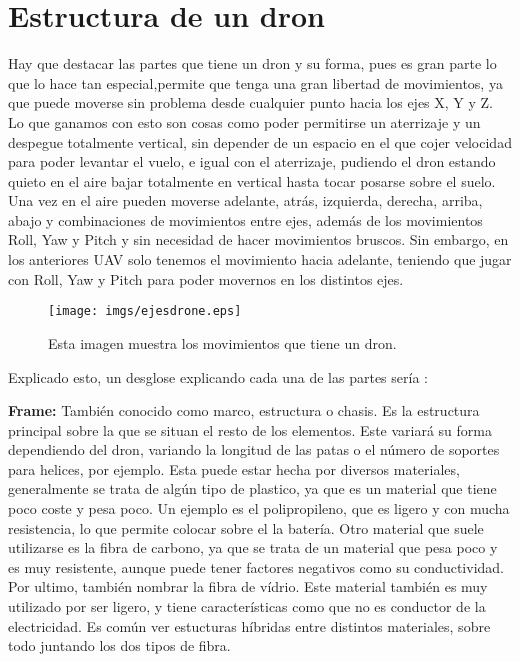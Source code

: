 \section{Estructura de un dron}
\hspace{1 cm} Hay que destacar las partes que tiene un dron y su forma, pues es gran parte lo que lo hace tan especial,permite que tenga una gran libertad de movimientos, ya que puede moverse sin problema desde cualquier punto hacia los ejes X, Y y Z. Lo que ganamos con esto son cosas como poder permitirse un aterrizaje y un despegue totalmente vertical, sin depender de un espacio en el que cojer velocidad para poder levantar el vuelo, e igual con el aterrizaje, pudiendo el dron estando quieto en el aire bajar totalmente en vertical hasta tocar posarse sobre el suelo. Una vez en el aire pueden moverse adelante, atr\'as, izquierda, derecha, arriba, abajo y combinaciones de movimientos entre ejes, adem\'as de los movimientos Roll, Yaw y Pitch y sin necesidad de hacer movimientos bruscos. Sin embargo, en los anteriores UAV solo tenemos el movimiento hacia adelante, teniendo que jugar con Roll, Yaw y Pitch para poder movernos en los distintos ejes.

\begin{figure}[ht]
	\centering
		\texttt{[image: imgs/ejesdrone.eps]}
		\caption{Esta imagen muestra los movimientos que tiene un dron.}
	\label{fig:ejesdrone}
\end{figure}

\hspace{1 cm} Explicado esto, un desglose explicando cada una de las partes ser\'ia :

\hspace{1 cm}\textbf{Frame:} Tambi\'en conocido como marco, estructura o chasis. Es la estructura principal sobre la que se situan el resto de los elementos. Este variar\'a su forma dependiendo del dron, variando la longitud de las patas o el n\'umero de soportes para helices, por ejemplo. Esta puede estar hecha por diversos materiales, generalmente se trata de alg\'un tipo de plastico, ya que es un material que tiene poco coste y pesa poco. Un ejemplo es el polipropileno, que es ligero y con mucha resistencia, lo que permite colocar sobre el la bater\'ia. Otro material que suele utilizarse es la fibra de carbono, ya que se trata de un material que pesa poco y es muy resistente, aunque puede tener factores negativos como su conductividad. Por ultimo, tambi\'en nombrar la fibra de v\'idrio. Este material tambi\'en es muy utilizado por ser ligero, y tiene caracter\'isticas como que no es conductor de la electricidad. Es com\'un ver estucturas h\'ibridas entre distintos materiales, sobre todo juntando los dos tipos de fibra. 


